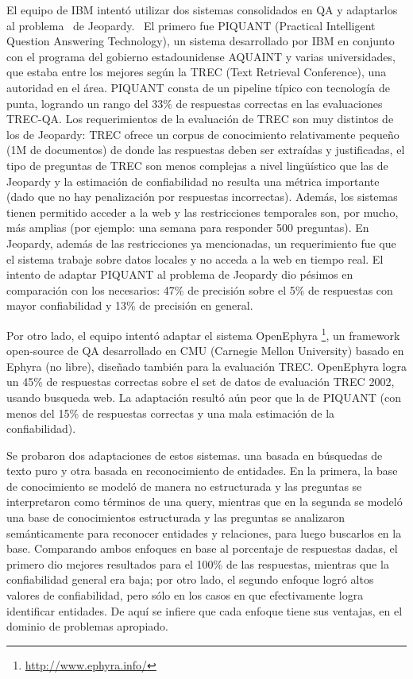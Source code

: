 El equipo de IBM intentó utilizar dos sistemas consolidados en QA y
adaptarlos al problema \ de Jeopardy. \ El primero fue PIQUANT
(Practical Intelligent Question Answering Technology), un sistema
desarrollado por IBM en conjunto con el programa del gobierno
estadounidense AQUAINT y varias universidades, que estaba entre los
mejores según la TREC (Text Retrieval Conference), una autoridad en
el área. PIQUANT consta de un pipeline típico con
tecnología de punta, logrando un rango del 33\% de respuestas
correctas en las evaluaciones TREC-QA. Los requerimientos de la
evaluación de TREC son muy distintos de los de Jeopardy: TREC ofrece
un corpus de conocimiento relativamente pequeño (1M de documentos) de
donde las respuestas deben ser extraídas y justificadas, el tipo de
preguntas de TREC son menos complejas a nivel lingüístico que las
de Jeopardy y la estimación de confiabilidad no resulta una métrica
importante (dado que no hay penalización por respuestas incorrectas).
Además, los sistemas tienen permitido acceder a la web y las
restricciones temporales son, por mucho, más amplias (por ejemplo:
una semana para responder 500 preguntas). En Jeopardy, además de las
restricciones ya mencionadas, un requerimiento fue que el sistema
trabaje sobre datos locales y no acceda a la web en tiempo real. El
intento de adaptar PIQUANT al problema de Jeopardy dio pésimos en
comparación con los necesarios: 47\% de precisión sobre el 5\% de
respuestas con mayor confiabilidad y 13\% de precisión en general. 

Por otro lado, el equipo intentó adaptar el sistema OpenEphyra \footnote{\url{http://www.ephyra.info/}}, un framework open-source de QA desarrollado en
CMU (Carnegie Mellon University) basado en Ephyra (no libre), diseñado también para la evaluación TREC. OpenEphyra logra un 45\% de respuestas correctas sobre el set de datos de evaluación TREC
2002, usando busqueda web. La adaptación resultó aún peor que la de PIQUANT (con menos del 15\% de respuestas correctas y una mala estimación de la confiabilidad). 

Se probaron dos adaptaciones de estos sistemas. una basada en búsquedas de texto puro y otra basada en reconocimiento de entidades. En la primera, la base de conocimiento se modeló de manera no
estructurada y las preguntas se interpretaron como términos de una query, mientras que en la segunda se modeló una base de conocimientos estructurada y las preguntas se analizaron semánticamente para
reconocer entidades y relaciones, para luego buscarlos en la base. Comparando ambos enfoques en base al porcentaje de respuestas dadas, el primero dio mejores resultados para el 100\% de las respuestas,
mientras que la confiabilidad general era baja; por otro lado, el segundo enfoque logró altos valores de confiabilidad, pero sólo en los casos en que efectivamente logra identificar entidades. De aquí
se infiere que cada enfoque tiene sus ventajas, en el dominio de problemas apropiado.

